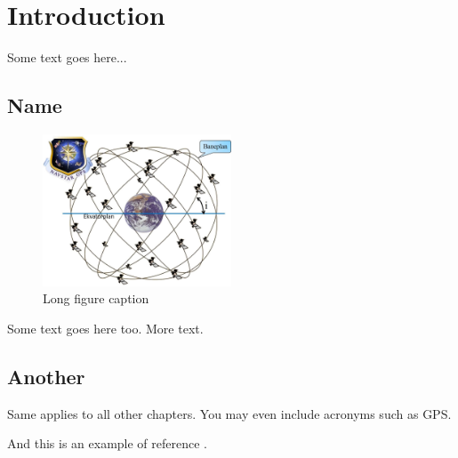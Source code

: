 \chapter{Introduction} 

Some text goes here...

\section{Name}

\begin{figure}[ht!]
  \centering
  \includegraphics[width=0.5\textwidth]{media/standard_compressed_Bilde1.jpg}
  \caption[Short figure caption]{Long figure caption}
  \label{fig:gps_fig}
\end{figure}

Some text goes here too. More text.

\section{Another}

Same applies to all other chapters. You may even include acronyms such as \ac{GPS}.

And this is an example of reference \cite{shehory_methods_1998}.
